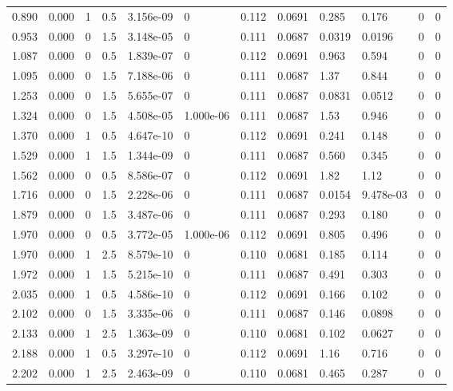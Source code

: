 \documentclass[preview]{standalone}
\begin{document}
{{\begin{tabular}{L{1.2cm}C{1.2cm} C{0.3cm}C{0.5cm} C{1.4cm}C{1.4cm} C{1.4cm}C{1.4cm} C{1.6cm}C{1.6cm} C{1.6cm}C{1.6cm}}
  0.890  &  0.000  & 1     & 0.5 &  3.156e-09  & 0  &  0.112&   0.0691& 0.285 & 0.176   &  0 & 0  \\ 
  0.953  &  0.000  & 0     & 1.5 &  3.148e-05  & 0  &  0.111&   0.0687& 0.0319 & 0.0196   &  0 & 0  \\ 
  1.087  &  0.000  & 0     & 0.5 &  1.839e-07  & 0  &  0.112&   0.0691& 0.963 & 0.594   &  0 & 0  \\ 
  1.095  &  0.000  & 0     & 1.5 &  7.188e-06  & 0  &  0.111&   0.0687& 1.37 & 0.844   &  0 & 0  \\ 
  1.253  &  0.000  & 0     & 1.5 &  5.655e-07  & 0  &  0.111&   0.0687& 0.0831 & 0.0512   &  0 & 0  \\ 
  1.324  &  0.000  & 0     & 1.5 &  4.508e-05  & 1.000e-06  &  0.111&   0.0687& 1.53 & 0.946   &  0 & 0  \\ 
  1.370  &  0.000  & 1     & 0.5 &  4.647e-10  & 0  &  0.112&   0.0691& 0.241 & 0.148   &  0 & 0  \\ 
  1.529  &  0.000  & 1     & 1.5 &  1.344e-09  & 0  &  0.111&   0.0687& 0.560 & 0.345   &  0 & 0  \\ 
  1.562  &  0.000  & 0     & 0.5 &  8.586e-07  & 0  &  0.112&   0.0691& 1.82 & 1.12   &  0 & 0  \\ 
  1.716  &  0.000  & 0     & 1.5 &  2.228e-06  & 0  &  0.111&   0.0687& 0.0154 & 9.478e-03   &  0 & 0  \\ 
  1.879  &  0.000  & 0     & 1.5 &  3.487e-06  & 0  &  0.111&   0.0687& 0.293 & 0.180   &  0 & 0  \\ 
  1.970  &  0.000  & 0     & 0.5 &  3.772e-05  & 1.000e-06  &  0.112&   0.0691& 0.805 & 0.496   &  0 & 0  \\ 
  1.970  &  0.000  & 1     & 2.5 &  8.579e-10  & 0  &  0.110&   0.0681& 0.185 & 0.114   &  0 & 0  \\ 
  1.972  &  0.000  & 1     & 1.5 &  5.215e-10  & 0  &  0.111&   0.0687& 0.491 & 0.303   &  0 & 0  \\ 
  2.035  &  0.000  & 1     & 0.5 &  4.586e-10  & 0  &  0.112&   0.0691& 0.166 & 0.102   &  0 & 0  \\ 
  2.102  &  0.000  & 0     & 1.5 &  3.335e-06  & 0  &  0.111&   0.0687& 0.146 & 0.0898   &  0 & 0  \\ 
  2.133  &  0.000  & 1     & 2.5 &  1.363e-09  & 0  &  0.110&   0.0681& 0.102 & 0.0627   &  0 & 0  \\ 
  2.188  &  0.000  & 1     & 0.5 &  3.297e-10  & 0  &  0.112&   0.0691& 1.16 & 0.716   &  0 & 0  \\ 
  2.202  &  0.000  & 1     & 2.5 &  2.463e-09  & 0  &  0.110&   0.0681& 0.465 & 0.287   &  0 & 0  \\ 

\end{tabular}}}
\end{document}
